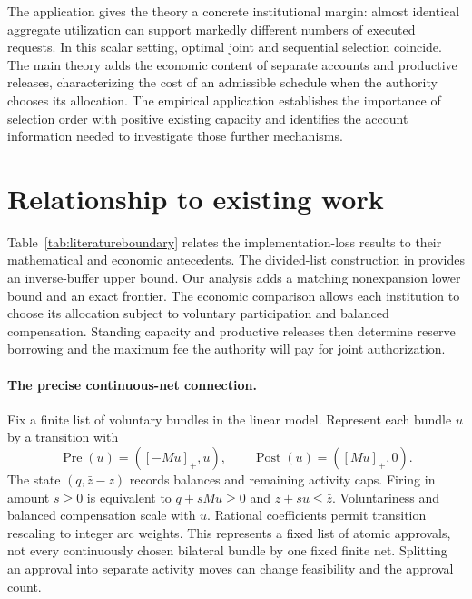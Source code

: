 \documentclass[ecta,draft,supplement]{econsocart}
\theoremstyle{definition}
\theoremstyle{definition}
\begin{document}
\begin{appendix}
The application gives the theory a concrete institutional margin:
almost identical aggregate utilization can support markedly different
numbers of executed requests. In this scalar setting, optimal joint
and sequential selection coincide. The main theory adds the economic
content of separate accounts and productive releases, characterizing
the cost of an admissible schedule when the authority chooses its
allocation. The empirical application establishes the importance of
selection order with positive existing capacity and identifies the
account information needed to investigate those further mechanisms.

\section{Relationship to existing work}
\label{sec:literature}\label{sec:literaturecomparison}

Table~\ref{tab:literatureboundary} relates the implementation-loss results to
their mathematical and economic antecedents. The divided-list construction
in \citet[Lemma~13]{FracaHaddad2015} provides an inverse-buffer upper bound.
Our analysis adds a matching nonexpansion lower bound and an exact frontier.
The economic comparison allows each institution to choose its allocation
subject to voluntary participation and balanced compensation. Standing
capacity and productive releases then determine reserve borrowing and the
maximum fee the authority will pay for joint authorization.

\paragraph{The precise continuous-net connection.}
Fix a finite list of voluntary bundles in the linear model. Represent each
bundle $u$ by a transition with
\[
 \operatorname{Pre}(u)=([-Mu]_+,u),\qquad
 \operatorname{Post}(u)=([Mu]_+,0).
\]
The state $(q,\bar z-z)$ records balances and remaining activity caps.
Firing in amount $s\geq0$ is equivalent to $q+sMu\geq0$ and
$z+su\leq\bar z$. Voluntariness and balanced compensation scale with $u$.
Rational coefficients permit transition rescaling to integer arc weights.
This represents a fixed list of atomic approvals, not every continuously
chosen bilateral bundle by one fixed finite net. Splitting an approval into
separate activity moves can change feasibility and the approval count.


\end{appendix}
\end{document}
